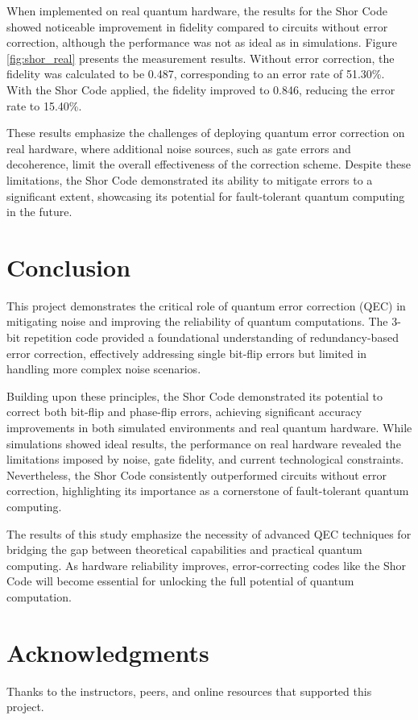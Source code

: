 \documentclass[10pt]{article}
\begin{document}
\begin{multicols}{2}
When implemented on real quantum hardware, the results for the Shor Code showed noticeable improvement in fidelity compared to circuits without error correction, although the performance was not as ideal as in simulations. Figure \ref{fig:shor_real} presents the measurement results. Without error correction, the fidelity was calculated to be 0.487, corresponding to an error rate of 51.30\%. With the Shor Code applied, the fidelity improved to 0.846, reducing the error rate to 15.40\%.

These results emphasize the challenges of deploying quantum error correction on real hardware, where additional noise sources, such as gate errors and decoherence, limit the overall effectiveness of the correction scheme. Despite these limitations, the Shor Code demonstrated its ability to mitigate errors to a significant extent, showcasing its potential for fault-tolerant quantum computing in the future.

\section*{Conclusion}
This project demonstrates the critical role of quantum error correction (QEC) in mitigating noise and improving the reliability of quantum computations. The 3-bit repetition code provided a foundational understanding of redundancy-based error correction, effectively addressing single bit-flip errors but limited in handling more complex noise scenarios.

Building upon these principles, the Shor Code demonstrated its potential to correct both bit-flip and phase-flip errors, achieving significant accuracy improvements in both simulated environments and real quantum hardware. While simulations showed ideal results, the performance on real hardware revealed the limitations imposed by noise, gate fidelity, and current technological constraints. Nevertheless, the Shor Code consistently outperformed circuits without error correction, highlighting its importance as a cornerstone of fault-tolerant quantum computing.

The results of this study emphasize the necessity of advanced QEC techniques for bridging the gap between theoretical capabilities and practical quantum computing. As hardware reliability improves, error-correcting codes like the Shor Code will become essential for unlocking the full potential of quantum computation.


\section*{Acknowledgments}
Thanks to the instructors, peers, and online resources that supported this project.

\end{multicols}

\printbibliography
\end{document}
